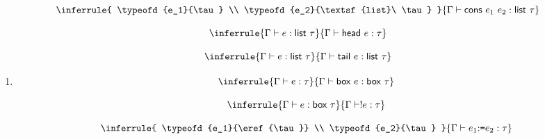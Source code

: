 \[
  \inferrule
  { \typeofd{e_1}{\tau} \\ \typeofd{e_2}{\textsf{list}\ \tau} }
  { \typeofd{\textsf{cons}\ e_1\ e_2}{\textsf{list}\ \tau} }
\]

\[
  \inferrule
  { \typeofd{e}{\textsf{list}\ \tau} }
  { \typeofd{\textsf{head}\ e}{\tau} }
\]

\[
  \inferrule
  { \typeofd{e}{\textsf{list}\ \tau} }
  { \typeofd{\textsf{tail}\ e}{\textsf{list}\ \tau} }
\]

\textbf{}
\begin{enumerate}
  \item
    \[
      \inferrule
      { \typeofd{e}{\tau} }
      { \typeofd{\eref{e}}{\eref{\tau}} }
    \]

    \[
      \inferrule
      { \typeofd{e}{\eref{\tau}} }
      { \typeofd{\ederef{e}}{\tau} }
    \]

    \[
      \inferrule
      { \typeofd{e_1}{\eref{\tau}} \\ \typeofd{e_2}{\tau} }
      { \typeofd{\eset{e_1}{e_2}}{\tau} }
    \]


\end{enumerate}
